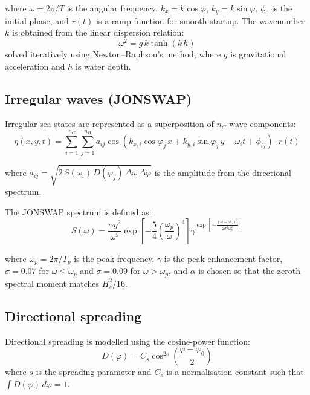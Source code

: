 \documentclass[11pt]{article}
\begin{document}
where $\omega = 2\pi/T$ is the angular frequency, $k_x = k\cos\varphi$, $k_y = k\sin\varphi$, $\phi_0$ is the initial phase, and $r(t)$ is a ramp function for smooth startup. The wavenumber $k$ is obtained from the linear dispersion relation:
\begin{equation}
\omega^2 = g\,k\tanh(k\,h)
\end{equation}
solved iteratively using Newton--Raphson's method, where $g$ is gravitational acceleration and $h$ is water depth.

\subsection{Irregular waves (JONSWAP)}

Irregular sea states are represented as a superposition of $n_C$ wave components:
\begin{equation}
\eta(x,y,t) = \sum_{i=1}^{n_C}\sum_{j=1}^{n_H} a_{ij}\cos\left(k_{x,i}\cos\varphi_j\, x + k_{y,i}\sin\varphi_j\, y - \omega_i t + \phi_{ij}\right)\cdot r(t)
\end{equation}

where $a_{ij} = \sqrt{2\,S(\omega_i)\,D(\varphi_j)\,\Delta\omega\,\Delta\varphi}$ is the amplitude from the directional spectrum.

The JONSWAP spectrum is defined as:
\begin{equation}
S(\omega) = \frac{\alpha g^2}{\omega^5}\exp\left[-\frac{5}{4}\left(\frac{\omega_p}{\omega}\right)^4\right]\gamma^{\exp\left[-\frac{(\omega-\omega_p)^2}{2\sigma^2\omega_p^2}\right]}
\end{equation}

where $\omega_p = 2\pi/T_p$ is the peak frequency, $\gamma$ is the peak enhancement factor, $\sigma = 0.07$ for $\omega \leq \omega_p$ and $\sigma = 0.09$ for $\omega > \omega_p$, and $\alpha$ is chosen so that the zeroth spectral moment matches $H_s^2/16$.

\subsection{Directional spreading}

Directional spreading is modelled using the cosine-power function:
\begin{equation}
D(\varphi) = C_s\cos^{2s}\left(\frac{\varphi - \varphi_0}{2}\right)
\end{equation}
where $s$ is the spreading parameter and $C_s$ is a normalisation constant such that $\int D(\varphi)\,d\varphi = 1$.
\end{document}
